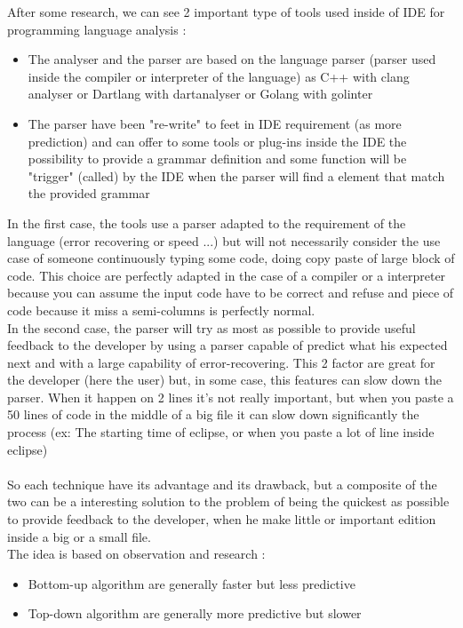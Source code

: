 After some research, we can see 2 important type of tools used inside of IDE for programming language analysis :
\begin{itemize}
\item The analyser and the parser are based on the language parser (parser used inside the compiler or interpreter of the language) as C++ with clang analyser \cite{Clang5:online} or Dartlang with dartanalyser\cite{darta0:online} or Golang with golinter \cite{golan5:online}
\item The parser have been "re-write" to feet in IDE requirement (as more prediction) and can offer to some tools or plug-ins inside the IDE the possibility to provide a grammar definition and some function will be "trigger" (called) by the IDE when the parser will find a element that match the provided grammar
\end{itemize}
In the first case, the tools use a parser adapted to the requirement of the language (error recovering or speed ...) but will not necessarily consider the use case of someone continuously typing some code, doing copy \/ paste of large block of code. This choice are perfectly adapted in the case of a compiler or a interpreter because you can assume the input code have to be correct and refuse and piece of code because it miss a semi-columns is perfectly normal.
\\
In the second case, the parser will try as most as possible to provide useful feedback to the developer by using a parser capable of predict what his expected next and with a large capability of error-recovering. This 2 factor are great for the developer (here the user) but, in some case, this features can slow down the parser. When it happen on 2 lines it's not really important, but when you paste a 50 lines of code in the middle of a big file it can slow down significantly the process (ex: The starting time of eclipse, or when you paste a lot of line inside eclipse)
\\
\\
So each technique have its advantage and its drawback, but a composite of the two can be a interesting solution to the problem of being the quickest as possible to provide feedback to the developer, when he make little or important edition inside a big or a small file.
\\
The idea is based on observation and research :
\begin{itemize}
\item Bottom-up algorithm are generally faster but less predictive
\item Top-down algorithm are generally more predictive but slower
\end{itemize}

